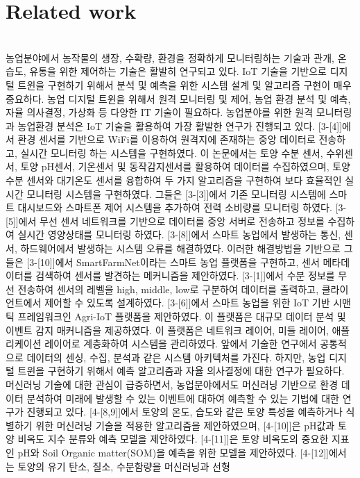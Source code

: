 \documentclass[11pt]{article}
\begin{document}
\section{Related work}
\indent \\농업분야에서 농작물의 생장, 수확량, 환경을 정확하게 모니터링하는 기술과 관개, 온습도, 유통을 위한 제어하는 기술은 활발히 연구되고 있다. IoT 기술을 기반으로 디지털 트윈을 구현하기 위해서 분석 및 예측을 위한 시스템 설계 및 알고리즘 구현이 매우 중요하다. 농업 디지털 트윈을 위해서 원격 모니터링
및 제어, 농업 환경 분석 및 예측, 자율 의사결정, 가상화 등 다양한 IT 기술이 필요하다. 농업분야를 위한 원격 모니터링 과 농업환경 분석은 IoT 기술을 활용하여 가장 활발한 연구가 진행되고 있다. [3-[4]]에서 환경 센서를 기반으로 WiFi를 이용하여 원격지에 존재하는 중앙 데이터로 전송하고, 실시간 모니터링 하는 시스템을 구현하였다. 이 논문에서는 토양 수분 센서, 수위센서, 토양 pH센서, 기온센서 및 동작감지센서를 활용하여 데이터를 수집하였으며, 토양 수분 센서와 대기온도 센서를 융합하여 두 가지 알고리즘을 구현하여 보다 효율적인 실시간 모니터링 시스템을 구현하였다. 그들은 [3-[3]]에서 기존 모니터링 시스템에 스마트
대시보드와 스마트폰 제어 시스템을 추가하여 전력 소비량를 모니터링 하였다. [3-[5]]에서 무선 센서 네트워크를 기반으로 데이터를 중앙 서버로 전송하고 정보를 수집하여 실시간 영양상태를 모니터링 하였다. [3-[8]]에서 스마트 농업에서 발생하는 통신, 센서, 하드웨어에서 발생하는 시스템 오류를 해결하였다. 이러한 해결방법을 기반으로 그들은 [3-[10]]에서 SmartFarmNet이라는 스마트 농업 플랫폼을 구현하고, 센서 메타데이터를 검색하여 센서를 발견하는 메커니즘을 제안하였다. [3-[1]]에서 수분 정보를 무선 전송하여 센서의 레벨을 high, middle, low로 구분하여 데이터를 출력하고, 클라이언트에서 제어할 수 있도록 설계하였다. [3-[6]]에서 스마트 농업을 위한 IoT 기반 시맨틱 프레임워크인 Agri-IoT 플랫폼을 제안하였다. 이 플랫폼은 대규모 데이터 분석 및 이벤트 감지 매커니즘을 제공하였다. 이 플랫폼은 네트워크 레이어, 미들 레이어, 애플리케이션 레이어로 계층화하여 시스템을 관리하였다. 앞에서 기술한 연구에서 공통적으로 데이터의 센싱, 수집, 분석과 같은 시스템 아키텍처를 가진다. 하지만, 농업 디지털 트윈을 구현하기 위해서 예측 알고리즘과 자율 의사결정에 대한 연구가 필요하다. 머신러닝 기술에 대한 관심이 급증하면서, 농업분야에서도 머신러닝 기반으로 환경 데이터 분석하여 미래에 발생할 수 있는 이벤트에 대하여 예측할 수 있는 기법에 대한 연구가 진행되고 있다. [4-[8,9]]에서 토양의 온도, 습도와 같은 토양 특성을 예측하거나 식별하기 위한 머신러닝 기술을 적용한 알고리즘을 제안하였으며, [4-[10]]은 pH값과 토양 비옥도 지수 분류와 예측 모델을 제안하였다. [4-[11]]은 토양 비옥도의 중요한 지표인 pH와 Soil Organic matter(SOM)을 예측을 위한 모델을 제안하였다. [4-[12]]에서는 토양의 유기 탄소, 질소, 수분함량을 머신러닝과 선형
\end{document}
